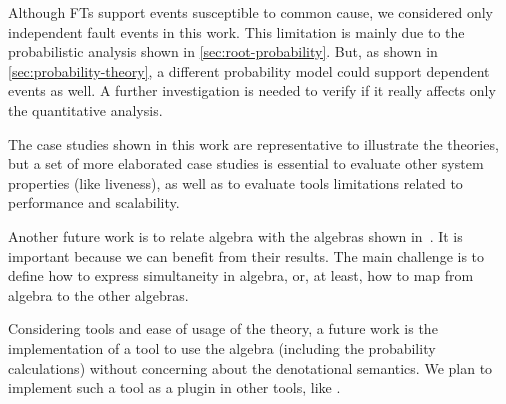 Although \acp{FT} support events susceptible to common cause, we considered only independent fault events in this work.
This limitation is mainly due to the probabilistic analysis shown in \cref{sec:root-probability}.
But, as shown in \cref{sec:probability-theory}, a different probability model could support dependent events as well.
A further investigation is needed to verify if it really affects only the quantitative analysis.

The case studies shown in this work are representative to illustrate the theories, but a set of more elaborated case studies is essential to evaluate other system properties (like liveness), as well as to evaluate tools limitations related to performance and scalability.

Another future work is to relate \ac{algebra} with the algebras shown in~\cite{Merle2010,Walker2009}.
It is important because we can benefit from their results.
The main challenge is to define how to express simultaneity in \ac{algebra}, or, at least, how to map from \ac{algebra} to the other algebras.

Considering tools and ease of usage of the theory, a future work is the implementation of a tool to use the algebra (including the probability calculations) without concerning about the denotational semantics.
We plan to implement such a tool as a plugin in other tools, like \simulink.






